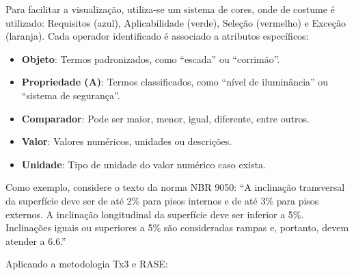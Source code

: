 Para facilitar a visualização, utiliza-se um sistema de cores, onde de costume é utilizado: Requisitos (azul), Aplicabilidade (verde), Seleção (vermelho) e Exceção (laranja). Cada operador identificado é associado a atributos específicos:
\begin{itemize}
    \item \textbf{Objeto}: Termos padronizados, como “escada” ou “corrimão”.
    \item \textbf{Propriedade (A)}: Termos classificados, como “nível de iluminância” ou “sistema de segurança”.
    \item \textbf{Comparador}: Pode ser maior, menor, igual, diferente, entre outros.
    \item \textbf{Valor}: Valores numéricos, unidades ou descrições.
    \item \textbf{Unidade}: Tipo de unidade do valor numérico caso exista. 
\end{itemize}

Como exemplo, considere o texto da norma NBR 9050: “A inclinação transversal da superfície deve ser de até 2\% para pisos internos e de até 3\% para pisos externos. A inclinação longitudinal da superfície deve ser inferior a 5\%. Inclinações iguais ou superiores a 5\% são consideradas rampas e, portanto, devem atender a 6.6.” 

Aplicando a metodologia Tx3 e RASE:

